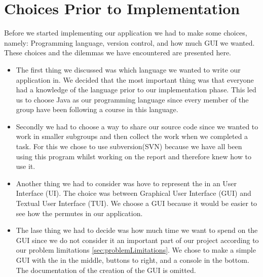 \chapter{Choices Prior to Implementation}
Before we started implementing our application we had to make some choices, namely: Programming language, version control, and how much GUI we wanted.
These choices and the dilemmas we have encountered are presented here.

\begin{itemize}
	\item The first thing we discussed was which language we wanted to write our application in.
We decided that the most important thing was that everyone had a knowledge of the language prior to our implementation phase.
This led us to choose Java as our programming language since every member of the group have been following a course in this language.

	\item Secondly we had to choose a way to share our source code since we wanted to work in smaller subgroups and then collect the work when we completed a task.
For this we chose to use subversion(SVN) because we have all been using this program whilst working on the report and therefore knew how to use it.

	\item Another thing we had to consider was hove to represent the \rubik{} in an User Interface (UI). The choice was between Graphical User Interface (GUI) and Textual User Interface (TUI). We choose a GUI because it would be easier to see how the \rubik{} permutes in our application.  
	\item The lase thing we had to decide was how much time we want to spend on the GUI since we do not consider it an important part of our project according to our problem limitations \ref{sec:problemLimitations}.
We chose to make a simple GUI with the \rubik{} in the middle, buttons to right, and a console in the bottom.
The documentation of the creation of the GUI is omitted.
\end{itemize}
